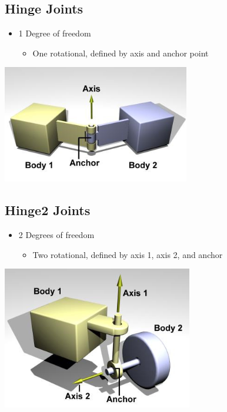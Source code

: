 \documentclass{article}
\begin{document}
\subsection*{Hinge Joints}
\begin{itemize}
    \item 1 Degree of freedom
    \begin{itemize}
        \item One rotational, defined by axis and anchor point
    \end{itemize}
\end{itemize}
\begin{center}
    \includegraphics*[scale=0.8]{W7_3.png}
\end{center}

\subsection*{Hinge2 Joints}
\begin{itemize}
    \item 2 Degrees of freedom
    \begin{itemize}
        \item Two rotational, defined by axis 1, axis 2, and anchor
    \end{itemize}
\end{itemize}
\begin{center}
    \includegraphics*[scale=0.8]{W7_4.png}
\end{center}
\end{document}
